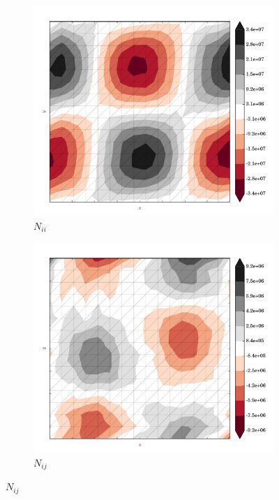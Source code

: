 \begin{figure}
  \begin{subfigure}[b]{0.3\linewidth}
    \includegraphics[width=\linewidth]{images/stress_balance/RS/N_ii.pdf}
  \caption{$N_{ii}$}
  \label{rs_N_ii}
  \end{subfigure}
  \begin{subfigure}[b]{0.3\linewidth}
    \includegraphics[width=\linewidth]{images/stress_balance/RS/N_ij.pdf}
  \caption{$N_{ij}$}
  \label{rs_N_ij}
  \end{subfigure}

\end{figure}
